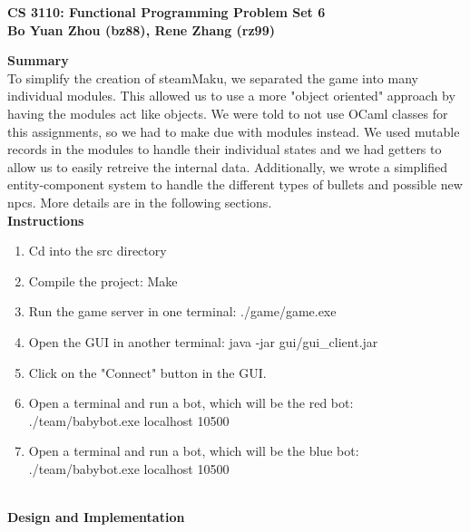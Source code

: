 \documentclass{article}[12pt]
\begin{document}
\begin{framed}
\noindent
\large{\textbf{CS 3110: Functional Programming \hfill Problem Set 6\\Bo Yuan Zhou (bz88), Rene Zhang (rz99)}}
\end{framed}

\noindent
\Large{\textbf{Summary}}
\hspace*{\fill}\\
	To simplify the creation of steamMaku, we separated the game into many individual modules. This allowed us to use a more "object oriented" approach by having the modules act like objects. We were told to not use OCaml classes for this assignments, so we had to make due with modules instead. We used mutable records in the modules to handle their individual states and we had getters to allow us to easily retreive the internal data. Additionally, we wrote a simplified entity-component system to handle the different types of bullets and possible new npcs. More details are in the following sections.
\hspace*{\fill}\\[\baselineskip]
\Large{\textbf{Instructions}}
\begin{enumerate}
	\item Cd into the src directory
	\item Compile the project: Make
	\item Run the game server in one terminal: ./game/game.exe
	\item Open the GUI in another terminal: java -jar gui/gui\_client.jar
	\item Click on the "Connect" button in the GUI.
	\item Open a terminal and run a bot, which will be the red bot: ./team/babybot.exe localhost 10500
	\item Open a terminal and run a bot, which will be the blue bot: ./team/babybot.exe localhost 10500
\end{enumerate}
\hspace*{\fill}\\
\Large{\textbf{Design and Implementation}}
\end{document}
